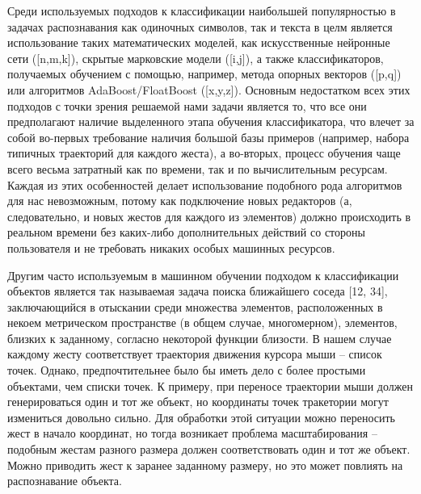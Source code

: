 \documentclass[a5paper]{article}
\begin{document}
Среди используемых подходов к классификации наибольшей популярностью в задачах распознавания как одиночных символов, так и текста в целм является 
использование таких математических моделей, как искусственные нейронные сети ([n,m,k]), скрытые марковские модели ([i,j]), а также  
классификаторов, получаемых обучением с помощью, например, метода опорных векторов ([p,q]) или алгоритмов AdaBoost/FloatBoost ([x,y,z]). 
Основным недостатком всех этих подходов с точки зрения решаемой нами задачи является то, что все они предполагают наличие выделенного этапа 
обучения классификатора, что влечет за собой во-первых требование наличия большой базы примеров (например, набора 
типичных траекторий для каждого жеста), а во-вторых, процесс обучения чаще всего весьма затратный как по времени, так и по вычислительным 
ресурсам. Каждая из этих особенностей делает использование подобного рода алгоритмов для нас невозможным, потому как подключение новых 
редакторов (а, следовательно, и новых жестов для каждого из элементов) должно происходить в реальном времени без каких-либо дополнительных 
действий со стороны пользователя и не требовать никаких особых машинных ресурсов. 

Другим часто используемым в машинном обучении подходом к классификации объектов является так называемая задача поиска ближайшего соседа 
[12, 34], заключающийся в отыскании среди множества элементов, расположенных в некоем метрическом пространстве (в общем случае, многомерном), 
элементов, близких к заданному, согласно некоторой функции близости. В нашем случае каждому жесту соответствует траектория движения курсора 
мыши -- список точек. Однако, предпочтительнее было бы иметь дело с более простыми 
объектами, чем списки точек. К примеру, при переносе траектории мыши должен генерироваться один и тот же объект, но координаты точек 
тракетории могут измениться довольно сильно. Для обработки этой ситуации можно переносить жест в начало координат, но тогда возникает проблема
масштабирования -- подобным жестам разного размера должен соответствовать один и тот же объект. Можно приводить жест к заранее 
заданному размеру, но это может повлиять на распознавание объекта.
\end{document}
